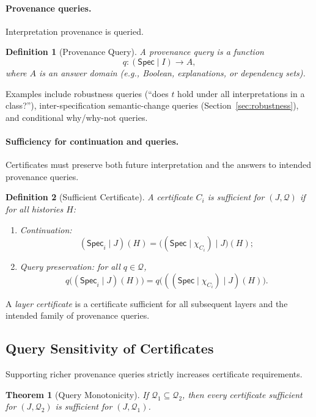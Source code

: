 \documentclass[acmsmall,nonacm]{acmart}
\newtheorem{definition}{Definition}
\newtheorem{theorem}{Theorem}
\theoremstyle{remark}
\numberwithin{definition}{section}
\numberwithin{theorem}{section}
\numberwithin{lemma}{section}
\numberwithin{corollary}{section}
\numberwithin{remark}{section}
\numberwithin{example}{section}
\numberwithin{observation}{section}
\numberwithin{assumption}{section}
\newcommand{\Spec}{\mathsf{Spec}}
\begin{document}
\paragraph{Provenance queries.}
Interpretation provenance is queried.

\begin{definition}[Provenance Query]
A \emph{provenance query} is a function
\[
  q : (\Spec \mid I) \to A ,
\]
where $A$ is an answer domain (e.g., Boolean, explanations, or dependency sets).
\end{definition}

Examples include robustness queries (“does $t$ hold under all interpretations in a
class?”), inter-specification semantic-change queries (Section~\ref{sec:robustness}), and
conditional why/why-not queries.

\paragraph{Sufficiency for continuation and queries.}
Certificates must preserve both future interpretation and the answers to intended
provenance queries.

\begin{definition}[Sufficient Certificate]
A certificate $C_i$ is \emph{sufficient for $(J,\mathcal{Q})$} if for all histories
$H$:
\begin{enumerate}
  \item \emph{Continuation:}
  \[
    (\Spec_i \mid J)(H)
    =
    \bigl((\Spec \mid \chi_{C_i}) \mid J\bigr)(H);
  \]
  \item \emph{Query preservation:} for all $q \in \mathcal{Q}$,
  \[
    q\bigl((\Spec_i \mid J)(H)\bigr)
    =
    q\bigl(((\Spec \mid \chi_{C_i}) \mid J)(H)\bigr).
  \]
\end{enumerate}
\end{definition}

A \emph{layer certificate} is a certificate sufficient for all subsequent layers
and the intended family of provenance queries.

\subsection{Query Sensitivity of Certificates}

Supporting richer provenance queries strictly increases certificate requirements.

\begin{theorem}[Query Monotonicity]
If $\mathcal{Q}_1 \subseteq \mathcal{Q}_2$, then every certificate sufficient for
$(J,\mathcal{Q}_2)$ is sufficient for $(J,\mathcal{Q}_1)$.
\end{theorem}
\end{document}

